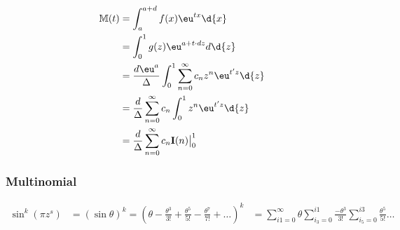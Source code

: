 \begin{align*}
    \M(t)
    &= \int_{a}^{a+d} f(x) \eu^{tx} \d{x} \\
    &= \int_{0}^{1} g(z) \eu^{a + t \cdot dz} d \d{z} \\
    &= \frac{d \eu^a}{\Delta} \int_{0}^{1} \sum_{n=0}^{\infty} c_n z^n \eu^{t'z} \d{z} \\
    &= \frac{d}{\Delta} \sum_{n=0}^{\infty} c_n \int_0^1 z^n \eu^{t'z} \d{z} \\
    &= \frac{d}{\Delta} \sum_{n=0}^{\infty}  c_n \I(n) \big|_0^1 \\
\end{align*}

\subsubsection{Multinomial}
\begin{align*}
    \sin^k(\pi z^s)
    &= \left( \sin{\theta} \right)^k = ( \theta - \frac{\theta^3}{3!} + \frac{\theta^5}{5!} - \frac{\theta^7}{7!} + \dots )^k
    &= \sum_{i1=0}^{\infty} {\theta \sum_{i_3=0}^{i1} {\frac{-\theta^3}{3!} \sum_{i_5=0}^{i3} {\frac{\theta^5}{5!} \dots } } }
\end{align*}